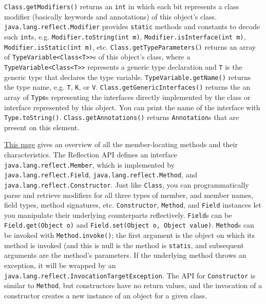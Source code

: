 \documentclass[8pt, table, xcdraw]{article}%
\begin{document}
\lstinline{Class.getModifiers()} returns an \lstinline{int} in which each bit represents a class modifier (basically keywords and annotations) of this object's class. \lstinline{java.lang.reflect.Modifier} provides \lstinline{static} methods and constants to decode such \lstinline{int}s, e.g. \lstinline{Modifier.toString(int m)}, \lstinline{Modifier.isInterface(int m)}, \lstinline{Modifier.isStatic(int m)}, etc. \lstinline{Class.getTypeParameters()} returns an array of \lstinline{TypeVariable<Class<T>>}s of this object's class, where a \lstinline{TypeVariable<Class<T>>} represents a generic type declaration and \lstinline{T} is the generic type that declares the type variable. \lstinline{TypeVariable.getName()} returns the type name, e.g. \lstinline{T}, \lstinline{K}, or \lstinline{V}. \lstinline{Class.getGenericInterfaces()} returns the an array of \lstinline{Type}s representing the interfaces directly implemented by the class or interface represented by this object. You can print the name of the interface with \lstinline{Type.toString()}. \lstinline{Class.getAnnotations()} returns \lstinline{Annotation}s that are present on this element.

\href{https://docs.oracle.com/javase/tutorial/reflect/class/classMembers.html}{This page} gives an overview of all the member-locating methods and their characteristics. The Reflection API defines an interface \lstinline{java.lang.reflect.Member}, which is implemented by \lstinline{java.lang.reflect.Field}, \lstinline{java.lang.reflect.Method}, and \lstinline{java.lang.reflect.Constructor}. Just like \lstinline{Class}, you can programmatically parse and retrieve modifiers for all three types of member, and member names, field types, method signatures, etc. \lstinline{Constructor}, \lstinline{Method}, and \lstinline{Field} instances let you manipulate their underlying counterparts reflectively. \lstinline{Field}s can be \lstinline{Field.get(Object o)} and \lstinline{Field.set(Object o, Object value)}. \lstinline{Method}s can be invoked with \lstinline{Method.invoke()}; the first argument is the object on which its method is invoked (and this is null is the method is \lstinline{statis}, and subsequent arguments are the method's parameters. If the underlying method throws an exception, it will be wrapped by an \lstinline{java.lang.reflect.InvocationTargetException}. The API for \lstinline{Constructor} is similar to \lstinline{Method}, but constructors have no return values, and the invocation of a constructor creates a new instance of an object for a given class.
\end{document}
